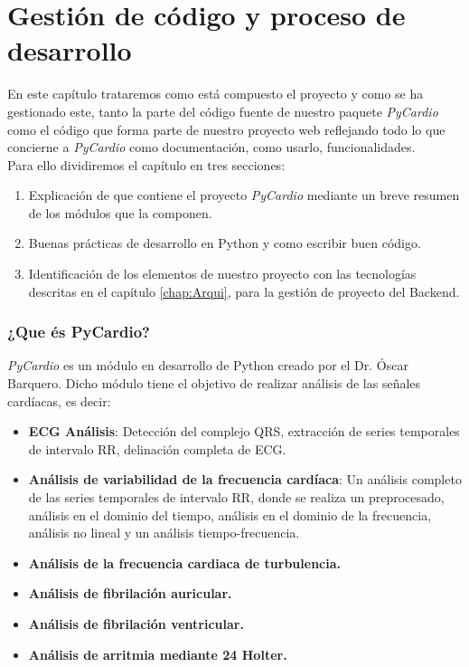 \chapter{Gestión de código y proceso de desarrollo}
\label{chap:codeManagement}

En este capítulo trataremos como está compuesto el proyecto y como se ha gestionado este, tanto la parte del código fuente de nuestro paquete \emph{PyCardio} como el código que forma parte de nuestro proyecto web reflejando todo lo que concierne a \emph{PyCardio} como documentación, como usarlo, funcionalidades. \\
Para ello dividiremos el capítulo en tres secciones:
\begin{enumerate}
    \item Explicación de que contiene el proyecto \emph{PyCardio} mediante un breve resumen de los módulos que la componen. 
    \item Buenas prácticas de desarrollo en Python y como escribir buen código.
    \item Identificación de los elementos de nuestro proyecto con las tecnologías descritas en el capítulo \ref{chap:Arqui}, para la gestión de proyecto del Backend.
\end{enumerate}

\subsection{¿Que és PyCardio?}
\label{subsec:explainPyCardio}
\emph{PyCardio} es un módulo en desarrollo  de Python creado por el Dr. Óscar Barquero. Dicho módulo tiene el objetivo de realizar análisis de las señales cardíacas, es decir:
\begin{itemize}
    \item \textbf{ECG Análisis}: Detección del complejo QRS, extracción de series temporales de intervalo RR, delinación completa de ECG.
    \item \textbf{Análisis de variabilidad de la frecuencia cardíaca}: Un análisis completo de las series temporales de intervalo RR, donde se realiza un preprocesado, análisis en  el dominio del tiempo, análisis en el dominio de la frecuencia, análisis no lineal y un análisis tiempo-frecuencia.
    \item \textbf{Análisis de la frecuencia cardiaca de turbulencia.}
    \item \textbf{Análisis de fibrilación auricular.}
    \item \textbf{Análisis de fibrilación ventricular.}
    \item \textbf{Análisis de arritmia mediante 24 Holter.}
\end{itemize}

